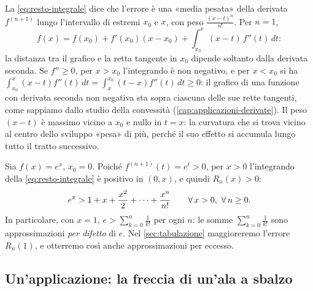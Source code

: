 \begin{osservazione}
La \eqref{eq:resto-integrale} dice che l'errore è una «media pesata» della derivata
$f^{(n+1)}$ lungo l'intervallo di estremi $x_{0}$ e $x$, con peso $\frac{(x-t)^{n}}{n!}$. Per $n=1$,
\[
  f(x)=f(x_{0})+f'(x_{0})(x-x_{0})+\int_{x_{0}}^{x}(x-t)\,f''(t)\,dt :
\]
la distanza tra il grafico e la retta tangente in $x_{0}$ dipende soltanto dalla derivata
seconda. Se $f''\ge0$, per $x>x_{0}$ l'integrando è non negativo, e per $x<x_{0}$ si ha
$\int_{x_{0}}^{x}(x-t)f''(t)\,dt=\int_{x}^{x_{0}}(t-x)f''(t)\,dt\ge0$: il grafico di una funzione con
derivata seconda non negativa sta sopra ciascuna delle sue rette tangenti, come sappiamo
dallo studio della convessità (\cref{cap:applicazioni-derivate}). Il peso $(x-t)$ è
massimo vicino a $x_{0}$ e nullo in $t=x$: la curvatura che si trova vicino al centro dello
sviluppo «pesa» di più, perché il suo effetto si accumula lungo tutto il tratto
successivo.
\end{osservazione}

\begin{esempio}\label{es:exp-maggiore-taylor}
Sia $f(x)=e^{x}$, $x_{0}=0$. Poiché $f^{(n+1)}(t)=e^{t}>0$, per $x>0$ l'integrando della
\eqref{eq:resto-integrale} è positivo in $(0,x)$, e quindi $R_{n}(x)>0$:
\begin{equation}\label{eq:exp-maggiore-taylor}
  e^{x}>1+x+\frac{x^{2}}2+\dots+\frac{x^{n}}{n!} \qquad\forall\, x>0,\ \forall\, n\ge0 .
\end{equation}
In particolare, con $x=1$, $e>\sum_{k=0}^{n}\frac1{k!}$ per ogni $n$: le somme $\sum_{k=0}^{n}\frac1{k!}$ sono
approssimazioni \emph{per difetto} di $e$. Nel \cref{sec:tabulazione} maggioreremo
l'errore $R_{n}(1)$, e otterremo così anche approssimazioni per eccesso.
\end{esempio}

\subsection{Un'applicazione: la freccia di un'ala a sbalzo}

